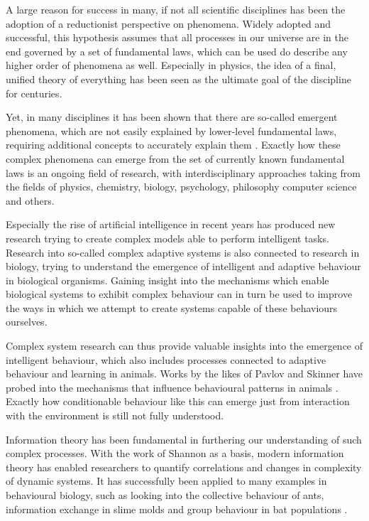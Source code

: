 \documentclass[12pt,a4paper]{article}
\begin{document}
A large reason for success in many, if not all scientific disciplines has been the adoption of a reductionist perspective on phenomena.
Widely adopted and successful, this hypothesis assumes that all processes in our universe are in the end governed by a set of fundamental laws, which can be used do describe any higher order of phenomena as well.
Especially in physics, the idea of a final, unified theory of everything has been seen as the ultimate goal of the discipline for centuries.

Yet, in many disciplines it has been shown that there are so-called emergent phenomena, which are not easily explained by lower-level fundamental laws, requiring additional concepts to accurately explain them \autocite{anderson1972more}.
Exactly how these complex phenomena can emerge from the set of currently known fundamental laws is an ongoing field of research, with interdisciplinary approaches taking from the fields of physics, chemistry, biology, psychology, philosophy computer science and others.

Especially the rise of artificial intelligence in recent years has produced new research trying to create complex models able to perform intelligent tasks.
Research into  so-called complex adaptive systems is also connected to research in biology, trying to understand the emergence of intelligent and adaptive behaviour in biological organisms.
Gaining insight into the mechanisms which enable biological systems to exhibit complex behaviour can in turn be used to improve the ways in which we attempt to create systems capable of these behaviours ourselves.

Complex system research can thus provide valuable insights into the emergence of intelligent behaviour, which also includes processes connected to adaptive behaviour and learning in animals.
Works by the likes of Pavlov and Skinner have probed into the mechanisms that influence behavioural patterns in animals \autocite{pavlov1906scientific, skinner1957experimental}.
Exactly how conditionable behaviour like this can emerge just from interaction with the environment is still not fully understood.

Information theory has been fundamental in furthering our understanding of such complex processes.
With the work of Shannon \autocite{shannon1948} as a basis, modern information theory has enabled researchers to quantify correlations and changes in complexity of dynamic systems.
It has successfully been applied to many examples in behavioural biology, such as looking into the collective behaviour of ants, information exchange in slime molds and group behaviour in bat populations \autocite{kim2021informational}.
\end{document}

